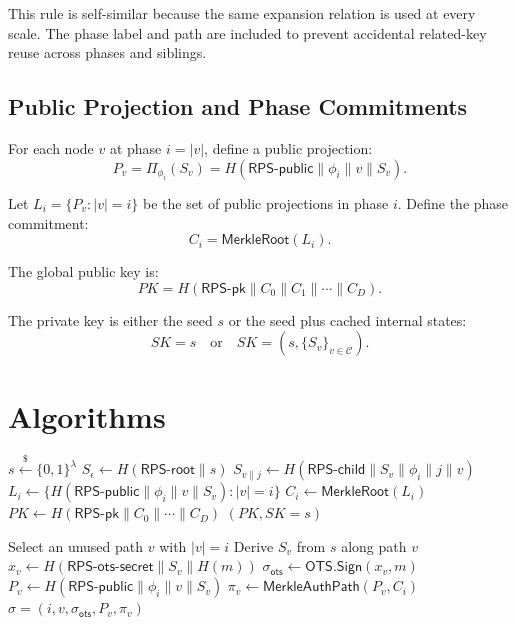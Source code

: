 \documentclass[11pt]{article}
\begin{document}
This rule is self-similar because the same expansion relation is used at every
scale. The phase label and path are included to prevent accidental related-key
reuse across phases and siblings.

\subsection{Public Projection and Phase Commitments}

For each node $v$ at phase $i=|v|$, define a public projection:
\[
  P_v = \Pi_{\phi_i}(S_v)
      = H(\textsf{RPS-public} \parallel \phi_i \parallel v \parallel S_v).
\]

Let $L_i=\{P_v : |v|=i\}$ be the set of public projections in phase $i$. Define
the phase commitment:
\[
  C_i = \mathsf{MerkleRoot}(L_i).
\]

The global public key is:
\[
  PK = H(\textsf{RPS-pk} \parallel C_0 \parallel C_1 \parallel \cdots \parallel C_D).
\]

The private key is either the seed $s$ or the seed plus cached internal states:
\[
  SK = s
  \quad\text{or}\quad
  SK = (s,\{S_v\}_{v \in \mathcal{C}}).
\]

\section{Algorithms}

\begin{algorithm}
\caption{$\mathsf{KeyGen}(1^\lambda,D,b)$}
\begin{algorithmic}[1]
\State $s \xleftarrow{\$} \{0,1\}^{\lambda}$
\State $S_\epsilon \gets H(\textsf{RPS-root} \parallel s)$
      \State $S_{v\parallel j} \gets H(\textsf{RPS-child}\parallel S_v\parallel\phi_i\parallel j\parallel v)$
    \EndFor
  \EndFor
\EndFor
{}
  \State $L_i \gets \{H(\textsf{RPS-public}\parallel\phi_i\parallel v\parallel S_v): |v|=i\}$
  \State $C_i \gets \mathsf{MerkleRoot}(L_i)$
\EndFor
\State $PK \gets H(\textsf{RPS-pk}\parallel C_0\parallel\cdots\parallel C_D)$
\State \Return $(PK,SK=s)$
\end{algorithmic}
\end{algorithm}

\begin{algorithm}
\caption{$\mathsf{Sign}(SK,m,i)$}
\begin{algorithmic}[1]
\State Select an unused path $v$ with $|v|=i$
\State Derive $S_v$ from $s$ along path $v$
\State $x_v \gets H(\textsf{RPS-ots-secret}\parallel S_v\parallel H(m))$
\State $\sigma_{\mathsf{ots}} \gets \mathsf{OTS.Sign}(x_v,m)$
\State $P_v \gets H(\textsf{RPS-public}\parallel\phi_i\parallel v\parallel S_v)$
\State $\pi_v \gets \mathsf{MerkleAuthPath}(P_v,C_i)$
\State \Return $\sigma=(i,v,\sigma_{\mathsf{ots}},P_v,\pi_v)$
\end{algorithmic}
\end{algorithm}
\end{document}
